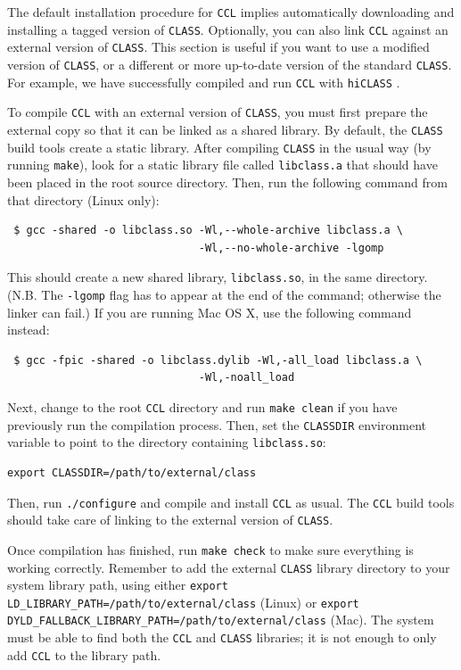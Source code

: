 \documentclass[\docopts]{\docclass}
\newcommand{\ccl}{{\tt CCL}\xspace}
\begin{document}
The default installation procedure for \ccl implies automatically downloading and installing a tagged version of {\tt CLASS}. Optionally, you can also link \ccl against an external version of {\tt CLASS}. This section is useful if you want to use a modified version of {\tt CLASS}, or a different or more up-to-date version of the standard {\tt CLASS}. For example, we have successfully compiled and run \ccl with {\tt hiCLASS} \citep{hiclass}.

To compile \ccl with an external version of {\tt CLASS}, you must first prepare the external copy so that it can be linked as a shared library. By default, the {\tt CLASS} build tools create a static library. After compiling {\tt CLASS} in the usual way (by running {\tt make}), look for a static library file called {\tt libclass.a} that should have been placed in the root source directory. Then, run the following command from that directory (Linux only):
\begin{verbatim}
 $ gcc -shared -o libclass.so -Wl,--whole-archive libclass.a \
                              -Wl,--no-whole-archive -lgomp
\end{verbatim}
This should create a new shared library, {\tt libclass.so}, in the same directory. (N.B. The {\tt -lgomp} flag has to appear at the end of the command; otherwise the linker can fail.) If you are running Mac OS X, use the following command instead:
\begin{verbatim}
 $ gcc -fpic -shared -o libclass.dylib -Wl,-all_load libclass.a \
                              -Wl,-noall_load
\end{verbatim}

Next, change to the root \ccl directory and run {\tt make clean} if you have previously run the compilation process. Then, set the {\tt CLASSDIR} environment variable to point to the directory containing {\tt libclass.so}:
\begin{verbatim}
export CLASSDIR=/path/to/external/class
\end{verbatim}
Then, run {\tt ./configure} and compile and install \ccl as usual. The \ccl build tools should take care of linking to the external version of {\tt CLASS}.

Once compilation has finished, run {\tt make check} to make sure everything is working correctly. Remember to add the external {\tt CLASS} library directory to your system library path, using either {\tt export LD\_LIBRARY\_PATH=/path/to/external/class} (Linux) or {\tt export DYLD\_FALLBACK\_LIBRARY\_PATH=/path/to/external/class} (Mac). The system must be able to find both the \ccl and {\tt CLASS} libraries; it is not enough to only add \ccl to the library path.
\end{document}
